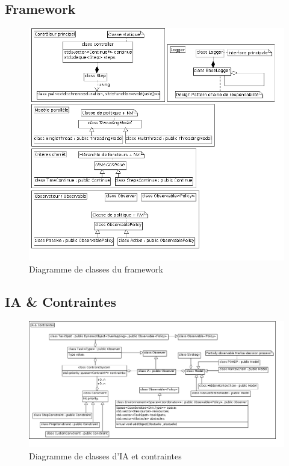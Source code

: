 \subsection{Framework}
\begin{figure}[!h]\centering
   \includegraphics[scale=0.5]{images/c_framework.png}
   \caption{\label{c_framework} Diagramme de classes du framework}
\end{figure}


\subsection{IA \& Contraintes}
\begin{figure}[!h]\centering
   \includegraphics[scale=0.5]{images/c_ia_contraintes.png}
   \caption{\label{c_ia_contraintes} Diagramme de classes d'IA et contraintes}
\end{figure}

